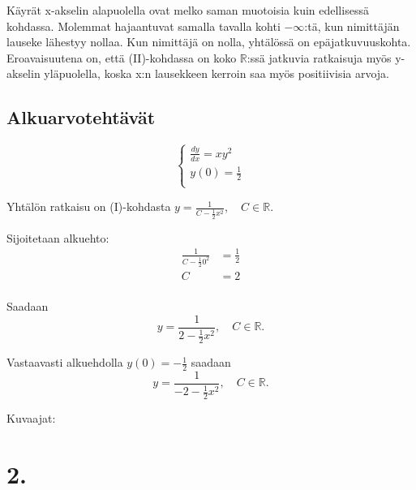 \documentclass{article}
\begin{document}
Käyrät x-akselin alapuolella ovat melko saman muotoisia kuin edellisessä
kohdassa. Molemmat hajaantuvat samalla tavalla kohti $-\infty$:tä, kun
nimittäjän lauseke lähestyy nollaa. Kun nimittäjä on nolla, yhtälössä on
epäjatkuvuuskohta. Eroavaisuutena on, että (II)-kohdassa on koko
$\mathbb{R}$:ssä jatkuvia ratkaisuja myös y-akselin yläpuolella, koska x:n
lausekkeen kerroin saa myös positiivisia arvoja.

\subsection*{Alkuarvotehtävät}

\[
  \begin{cases}
    \frac{dy}{dx} = xy^2 \\
    y(0) = \frac{1}{2} \\
  \end{cases}
\]

Yhtälön ratkaisu on (I)-kohdasta
$y = \frac{1}{C - \frac{1}{2}x^2}, \quad C \in \mathbb{R}$.

Sijoitetaan alkuehto:
\begin{align*}
  \frac{1}{C - \frac{1}{2}0^2} &= \frac{1}{2} \\
  C &= 2 \\
\end{align*}

Saadaan
\[
  y = \frac{1}{2 - \frac{1}{2}x^2}, \quad C \in \mathbb{R}.
\]

Vastaavasti alkuehdolla $y(0) = -\frac{1}{2}$ saadaan
\[
  y = \frac{1}{-2 - \frac{1}{2}x^2}, \quad C \in \mathbb{R}.
\]

Kuvaajat:

\begin{center}
\end{center}

\section*{2.}
\end{document}
